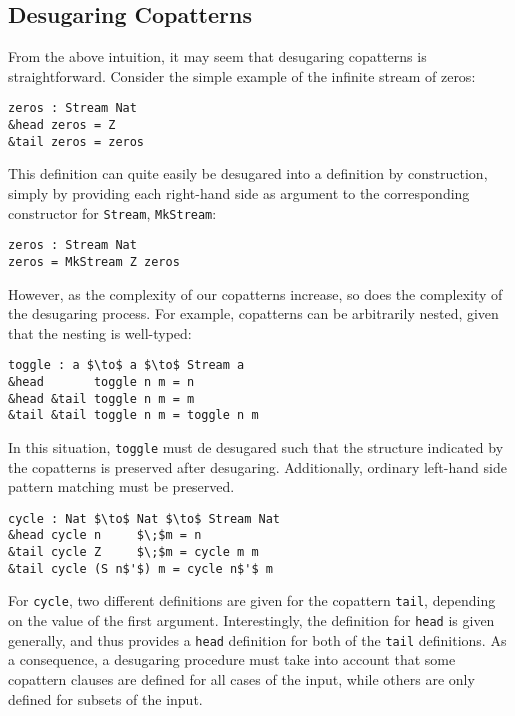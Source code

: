 \subsection{Desugaring Copatterns}
From the above intuition, it may seem that desugaring copatterns is
straightforward. Consider the simple example of the infinite stream of zeros:
\begin{lstlisting}[mathescape,title=\idrisBlock]
zeros : Stream Nat
&head zeros = Z
&tail zeros = zeros
\end{lstlisting}
This definition can quite easily be desugared into a definition by construction,
simply by providing each right-hand side as argument to the corresponding
constructor for \texttt{Stream}, \texttt{MkStream}:
\begin{lstlisting}[mathescape,title=\idrisBlock]
zeros : Stream Nat
zeros = MkStream Z zeros
\end{lstlisting}
However, as the complexity of our copatterns increase, so does the complexity of
the desugaring process. For example, copatterns can be arbitrarily nested,
given that the nesting is well-typed:
\begin{lstlisting}[mathescape,title=\idrisBlock]
toggle : a $\to$ a $\to$ Stream a
&head       toggle n m = n
&head &tail toggle n m = m
&tail &tail toggle n m = toggle n m
\end{lstlisting}
In this situation, \texttt{toggle} must de desugared such that the structure
indicated by the copatterns is preserved after desugaring. Additionally,
ordinary left-hand side pattern matching must be preserved.
\begin{lstlisting}[mathescape,title=\idrisBlock]
cycle : Nat $\to$ Nat $\to$ Stream Nat
&head cycle n     $\;$m = n
&tail cycle Z     $\;$m = cycle m m
&tail cycle (S n$'$) m = cycle n$'$ m
\end{lstlisting}
For \texttt{cycle}, two different definitions are given for the copattern
\texttt{tail}, depending on the value of the first argument. Interestingly, the
definition for \texttt{head} is given generally, and thus provides a
\texttt{head} definition for both of the \texttt{tail} definitions. As a
consequence, a desugaring procedure must take into account that some copattern
clauses are defined for all cases of the input, while others are only defined
for subsets of the input.


